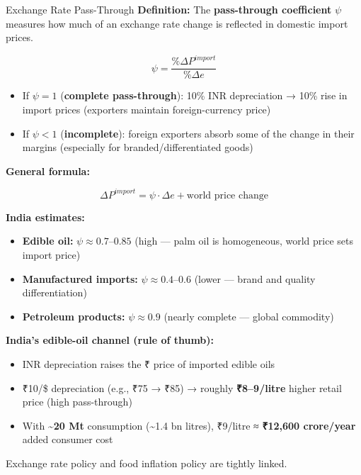 \documentclass[
  ignorenonframetext,
  aspectratio=169,
]{beamer}
\makeatletter
\providecommand{\tightlist}{%
  \setlength{\itemsep}{0pt}\setlength{\parskip}{0pt}}
\let\quarto@originallabel\label
\DeclareRobustCommand*{\label}[1]{\quarto@originallabel{#1}}
\makeatother
\begin{document}
\begin{frame}{Exchange Rate Pass-Through}
\label{exchange-rate-pass-through}
\textbf{Definition:} The \textbf{pass-through coefficient} \(\psi\)
measures how much of an exchange rate change is reflected in domestic
import prices.

\[\psi = \frac{\% \Delta P^{import}}{\% \Delta e}\]

\begin{itemize}
\tightlist
\item
  If \(\psi = 1\) (\textbf{complete pass-through}): 10\% INR
  depreciation → 10\% rise in import prices (exporters maintain
  foreign-currency price)
\item
  If \(\psi < 1\) (\textbf{incomplete}): foreign exporters absorb some
  of the change in their margins (especially for branded/differentiated
  goods)
\end{itemize}

\textbf{General formula:}

\[\Delta P^{import} = \psi \cdot \Delta e + \text{world price change}\]

\textbf{India estimates:}

\begin{itemize}
\tightlist
\item
  \textbf{Edible oil:} \(\psi \approx 0.7\)--\(0.85\) (high --- palm oil
  is homogeneous, world price sets import price)
\item
  \textbf{Manufactured imports:} \(\psi \approx 0.4\)--\(0.6\) (lower
  --- brand and quality differentiation)
\item
  \textbf{Petroleum products:} \(\psi \approx 0.9\) (nearly complete ---
  global commodity)
\end{itemize}

\textbf{India's edible-oil channel (rule of thumb):}

\begin{itemize}
\tightlist
\item
  INR depreciation raises the ₹ price of imported edible oils
\item
  ₹10/\$ depreciation (e.g., ₹75 → ₹85) → roughly \textbf{₹8--9/litre}
  higher retail price (high pass-through)
\item
  With \textasciitilde{}\textbf{20 Mt} consumption (\textasciitilde1.4
  bn litres), ₹9/litre ≈ \textbf{₹12,600 crore/year} added consumer cost
\end{itemize}

Exchange rate policy and food inflation policy are tightly linked.
\end{frame}
\end{document}
